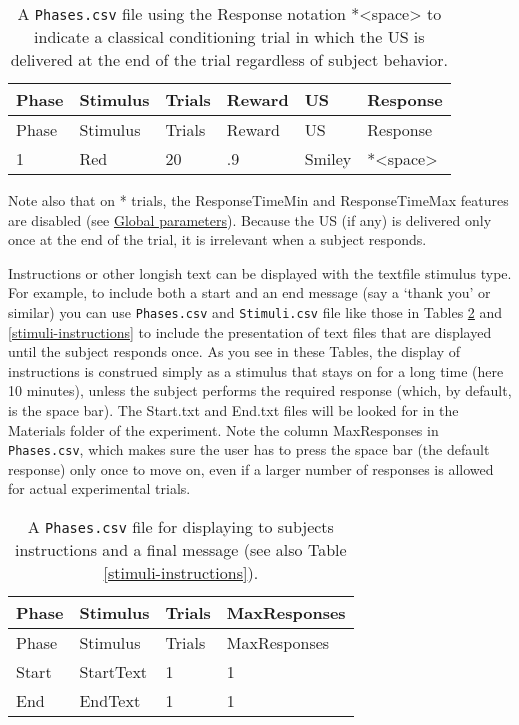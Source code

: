 \documentclass[11pt,]{article}
\begin{document}
\begin{longtable}[c]{@{}llllll@{}}
\caption{A \texttt{Phases.csv} file using the Response notation
*\textless{}space\textgreater{} to indicate a classical conditioning
trial in which the US is delivered at the end of the trial regardless of
subject behavior. \label{classical}}\tabularnewline
\toprule
Phase & Stimulus & Trials & Reward & US & Response\tabularnewline
\midrule
\endfirsthead
\toprule
Phase & Stimulus & Trials & Reward & US & Response\tabularnewline
\midrule
\endhead
1 & Red & 20 & .9 & Smiley &
*\textless{}space\textgreater{}\tabularnewline
\bottomrule
\end{longtable}

Note also that on * trials, the ResponseTimeMin and ResponseTimeMax
features are disabled (see \hyperref[global]{Global parameters}).
Because the US (if any) is delivered only once at the end of the trial,
it is irrelevant when a subject responds.


Instructions or other longish text can be displayed with the textfile
stimulus type. For example, to include both a start and an end message
(say a `thank you' or similar) you can use \texttt{Phases.csv} and
\texttt{Stimuli.csv} file like those in Tables \ref{phases-instructions}
and \ref{stimuli-instructions} to include the presentation of text files
that are displayed until the subject responds once. As you see in these
Tables, the display of instructions is construed simply as a stimulus
that stays on for a long time (here 10 minutes), unless the subject
performs the required response (which, by default, is the space bar).
The Start.txt and End.txt files will be looked for in the Materials
folder of the experiment. Note the column MaxResponses in
\texttt{Phases.csv}, which makes sure the user has to press the space
bar (the default response) only once to move on, even if a larger number
of responses is allowed for actual experimental trials.

\begin{longtable}[c]{@{}llll@{}}
\caption{A \texttt{Phases.csv} file for displaying to subjects
instructions and a final message (see also Table
\ref{stimuli-instructions}). \label{phases-instructions}}\tabularnewline
\toprule
Phase & Stimulus & Trials & MaxResponses\tabularnewline
\midrule
\endfirsthead
\toprule
Phase & Stimulus & Trials & MaxResponses\tabularnewline
\midrule
\endhead
Start & StartText & 1 & 1\tabularnewline
End & EndText & 1 & 1\tabularnewline
\bottomrule
\end{longtable}
\end{document}
